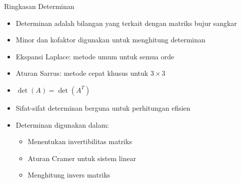 \documentclass{beamer}
\begin{document}
\begin{frame}[t,fragile]{Ringkasan Determinan}
\begin{itemize}
\item Determinan adalah bilangan yang terkait dengan matriks bujur sangkar
\item Minor dan kofaktor digunakan untuk menghitung determinan
\item Ekspansi Laplace: metode umum untuk semua orde
\item Aturan Sarrus: metode cepat khusus untuk $3 \times 3$
\item $\det(A) = \det(A^T)$
\item Sifat-sifat determinan berguna untuk perhitungan efisien
\item Determinan digunakan dalam:
    \begin{itemize}
    \item Menentukan invertibilitas matriks
    \item Aturan Cramer untuk sistem linear
    \item Menghitung invers matriks
    \end{itemize}
\end{itemize}
\end{frame}
\end{document}
